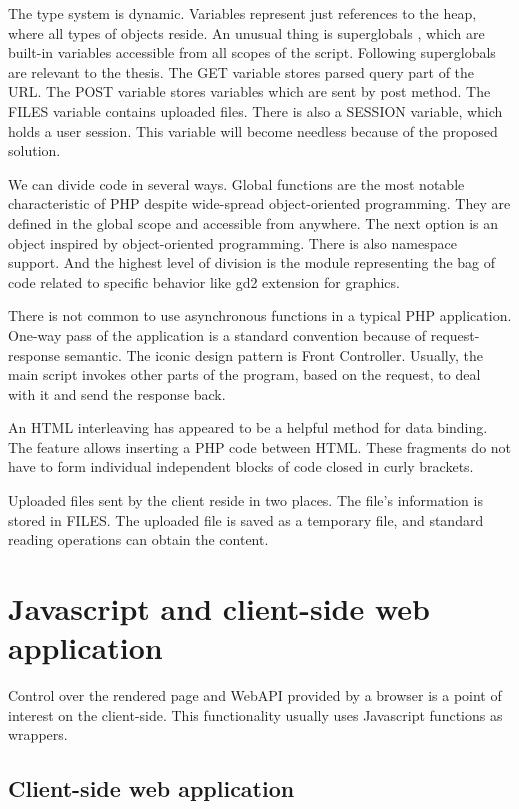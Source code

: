 The type system is dynamic.
Variables represent just references to the heap, where all types of objects reside.
An unusual thing is superglobals \cite{6}, which are built-in variables accessible from all scopes of the script.
Following superglobals are relevant to the thesis.
The GET variable stores parsed query part of the URL.
The POST variable stores variables which are sent by post method.
The FILES variable contains uploaded files.
There is also a SESSION variable, which holds a user session.
This variable will become needless because of the proposed solution.

We can divide code in several ways.
Global functions are the most notable characteristic of PHP despite wide-spread object-oriented programming.
They are defined in the global scope and accessible from anywhere.
The next option is an object inspired by object-oriented programming.
There is also namespace support.
And the highest level of division is the module representing the bag of code related to specific behavior like gd2 extension for graphics.

There is not common to use asynchronous functions in a typical PHP application.
One-way pass of the application is a standard convention because of request-response semantic.
The iconic design pattern is Front Controller.
Usually, the main script invokes other parts of the program, based on the request, to deal with it and send the response back.

An HTML interleaving has appeared to be a helpful method for data binding.
The feature allows inserting a PHP code between HTML.
These fragments do not have to form individual independent blocks of code closed in curly brackets.

Uploaded files sent by the client reside in two places.
The file's information is stored in FILES.
The uploaded file is saved as a temporary file, and standard reading operations can obtain the content.

\section{Javascript and client-side web application}

Control over the rendered page and WebAPI provided by a browser is a point of interest on the client-side.
This functionality usually uses Javascript functions as wrappers. 

\subsection{Client-side web application}

